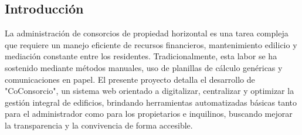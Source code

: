 \subsection{Introducción}

La administración de consorcios de propiedad horizontal es una tarea compleja que requiere un manejo eficiente de recursos financieros, mantenimiento edilicio y mediación constante entre los residentes. Tradicionalmente, esta labor se ha sostenido mediante métodos manuales, uso de planillas de cálculo genéricas y comunicaciones en papel. El presente proyecto detalla el desarrollo de "CoConsorcio", un sistema web orientado a digitalizar, centralizar y optimizar la gestión integral de edificios, brindando herramientas automatizadas básicas tanto para el administrador como para los propietarios e inquilinos, buscando mejorar la transparencia y la convivencia de forma accesible.
